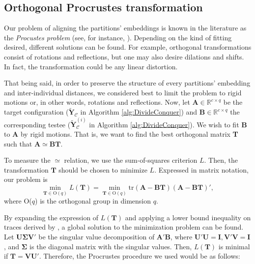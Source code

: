 \subsection{Orthogonal Procrustes transformation}
\label{sec:Procrustes}

Our problem of aligning the partitions' embeddings is known in the literature as the \textit{Procustes problem} (see, for instance, \citet{Borg2005}). Depending on the kind of fitting desired, different solutions can be found. For example, orthogonal transformations consist of rotations and reflections, but one may also desire dilations and shifts. In fact, the transformation could be any linear distortion.

That being said, in order to preserve the structure of every partitions' embedding and inter-individual distances, we considered best to limit the problem to rigid motions or, in other words, rotations and reflections. Now, let $\mathbf{A} \in \mathbb{R}^{c \times q}$ be the target configuration ($\mathbf{\tilde{Y}}_{\mathcal{C}}$ in Algorithm \ref{alg:DivideConquer}) and $\mathbf{B} \in \mathbb{R}^{c \times q}$ the corresponding testee ($\mathbf{\tilde{Y}}_{\mathcal{C}}^{(i)}$ in Algorithm \ref{alg:DivideConquer}). We wish to fit \textbf{B} to \textbf{A} by rigid motions. That is, we want to find the best orthogonal matrix \textbf{T} such that $\mathbf{A} \simeq \mathbf{BT}$.

To measure the $\simeq$ relation, we use the sum-of-squares criterion $L$. Then, the transformation $\mathbf{T}$ should be chosen to minimize $L$. Expressed in matrix notation, our problem is
$$
\min_{\mathbf{T} \in \text{O}(q)} L(\mathbf{T}) = \min_{\mathbf{T} \in \text{O}(q)} \text{tr}(\mathbf{A}-\mathbf{BT})(\mathbf{A}-\mathbf{BT})',
$$
where O($q$) is the orthogonal group in dimension $q$.

By expanding the expression of $L(\mathbf{T})$ and applying a lower bound inequality on traces derived by \cite{Kristof1970}, a global solution to the minimization problem can be found. Let $\mathbf{U}\boldsymbol{\Sigma}\mathbf{V}'$ be the singular value decomposition of $\mathbf{A}' \mathbf{B}$, where $\mathbf{U}' \mathbf{U}=\mathbf{I}, \mathbf{V}' \mathbf{V}=\mathbf{I}$, and $\boldsymbol{\Sigma}$ is the diagonal matrix with the singular values. Then, $L(\mathbf{T})$ is minimal if $\mathbf{T} = \mathbf{V} \mathbf{U}'$. Therefore, the Procrustes procedure we used would be as follows:

